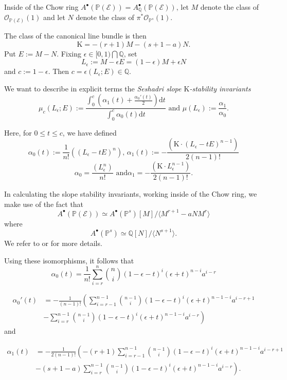 \documentclass[10pt,letterpaper]{amsart}
\providecommand{\binom}[2]{{#1\choose#2}}
\renewcommand{\leq}{\leqslant}
\newcommand{\Osh}{{\mathcal O}}                        %
\newcommand{\K}{\mathrm{K}}
\newcommand{\PP}{\mathbb{P}} %
\newcommand{\QQ}{\mathbb{Q}} %
\theoremstyle{definition}
\numberwithin{equation}{section}
\begin{document}
Inside of the Chow ring
$A^\bullet(\PP(\mathcal{E})) = A^\bullet_{\QQ}(\PP(\mathcal{E})) \text{,}$
let $M$ denote the class of $\Osh_{\PP(\mathcal{E})}(1)$ and let $N$ denote the class of $\pi^*\Osh_{\PP^s}(1)$.  

The class of the canonical line bundle is then
$$
\K = -(r+1)M - (s+1-a)N \text{.}
$$
Put
$E := M - N \text{.}$
Fixing 
$\epsilon \in [0,1) \bigcap \QQ \text{,}$
set
$$L_{\epsilon} := M - \epsilon E = (1 - \epsilon)M + \epsilon N$$
and
$c := 1 - \epsilon \text{.}$
Then
$c = \epsilon(L_{\epsilon};E) \in \QQ \text{.}$

We want to describe in explicit terms the \emph{Seshadri slope $\K$-stability invariants}
$$
\mu_c(L_{\epsilon};E) := \frac{ \int_0^c \left(\alpha_1(t) + \frac{\alpha_0'(t)}{2} \right) \mathrm{d}t}{\int_0^c \alpha_0(t)\mathrm{d}t}
\text{ and }
\mu(L_{\epsilon}) := \frac{\alpha_1}{\alpha_0} \text{.}
$$

Here, for $0 \leq t \leq c$, we have defined
$$
\alpha_0(t) := \frac{1}{n!} \left( (L_{\epsilon}-tE)^n \right) \text{, }
\alpha_1(t) := - \frac{\left(\K \cdot (L_{\epsilon}-tE)^{n-1}\right)}{2(n-1)!}
$$
$$
\alpha_0 = \frac{(L_{\epsilon}^n)}{n!}
\text{ 
and
}
\alpha_1 = - \frac{(\K \cdot L_{\epsilon}^{n-1})}{2(n-1)!} \text{.}
$$


In calculating the slope stability invariants, working inside of the Chow ring, we make use of the fact that 
$$
A^\bullet(\PP(\mathcal{E})) \simeq A^\bullet(\PP^s)[M] / \langle M^{r+1} - a N M^r \rangle 
$$
where
$$A^\bullet(\PP^s) \simeq \QQ[N] / \langle N^{s+1} \rangle \text{.}$$
We refer to \cite[Section 3.3]{Fulton} or \cite[Section 9.3]{Harris:Eisenbud:3264} for more details.

Using these isomorphisms, it follows that
$$
\alpha_0(t) = \frac{1}{n!} \sum_{i=r}^n \binom{n}{i}(1-\epsilon - t)^i(\epsilon + t)^{n-i}a^{i-r}
$$

\begin{align*}
\alpha_0'(t) & = - \frac{1}{(n-1)!} \left( \sum_{i = r - 1}^{n-1} \binom{n-1}{i}(1-\epsilon - t)^i(\epsilon + t)^{n-1-i} a^{i-r+1}  \right. \\
&
\left. 
- \sum_{i=r}^{n-1} \binom{n-1}{i}(1 - \epsilon - t)^i (\epsilon + t)^{n-1-i} a^{i-r} \right)
\end{align*}
and

\begin{align*}
\alpha_1(t) & = 
- \frac{1}{2 (n-1)!} \left( - (r+1) \sum_{i = r - 1}^{n-1} \binom{n-1}{i}(1-\epsilon - t)^i(\epsilon + t)^{n-1-i}a^{i-r+1} \right. \\
&
\left. -(s+1-a) \sum_{i=r}^{n-1} \binom{n-1}{i}(1 - \epsilon - t)^i (\epsilon + t)^{n-1-i} a^{i-r} \right) \text{.}
\end{align*}
\end{document}
